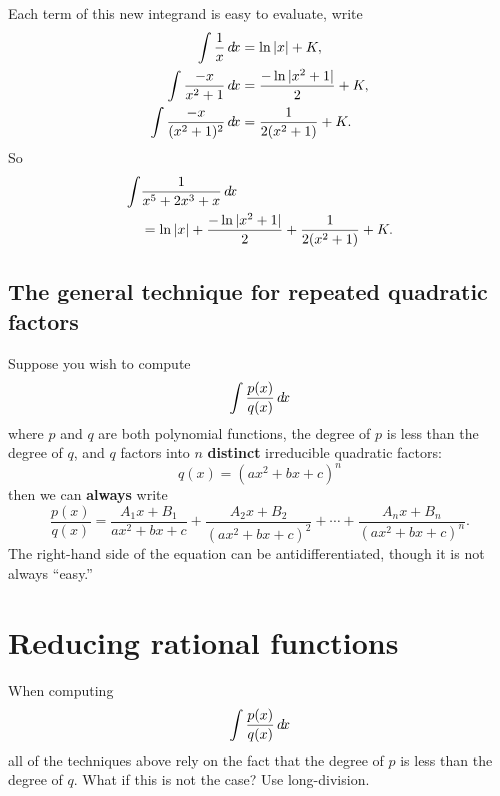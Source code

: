 \documentclass{ximera}
\begin{document}
\begin{example}
\begin{explanation}
\[    \]
    Each term of this new integrand is easy to evaluate, write
    \begin{align*}
      \int \frac{1}{x} \mathop{}\!d\! x &= \ln|x| + K,\\
      \int \frac{-x}{x^2+1} \mathop{}\!d\! x &= \frac{-\ln|x^2+1|}{2} +K,\\
      \int \frac{-x}{(x^2+1)^2} \mathop{}\!d\! x &= \frac{1}{2(x^2+1)}+K.
    \end{align*}
    So
    \begin{align*}
    \int &\frac{1}{x^5 + 2x^3  + x}\mathop{}\!d\! x \\
    &=\ln|x| + \frac{-\ln|x^2+1|}{2} + \frac{1}{2(x^2+1)}+K.
    \end{align*}
  \end{explanation}
\end{example}



\subsection{The general technique for repeated quadratic factors}
Suppose you wish to compute
\[
\int \frac{p(x)}{q(x)} \mathop{}\!d\! x
\]
where $p$ and $q$ are both polynomial functions, the degree of $p$ is
less than the degree of $q$, and $q$ factors into $n$
\textbf{distinct} irreducible quadratic factors:
\[
q(x) = (ax^2 + b x + c)^n 
\]
then we can \textbf{always} write
\[
\frac{p(x)}{q(x)}  = \frac{A_1x+B_1}{ax^2 + bx + c} + \frac{A_2x+B_2}{(ax^2 + bx + c)^2} + \cdots + \frac{A_nx+B_n}{(ax^2 + b x + c)^n}. 
\]
The right-hand side of the equation can be antidifferentiated, though it is not always ``easy.''


\section{Reducing rational functions}

When computing
\[
\int \frac{p(x)}{q(x)} \mathop{}\!d\! x
\]
all of the techniques above rely on the fact that the degree of $p$ is
less than the degree of $q$. What if this is not the case? Use
long-division.
\end{document}

